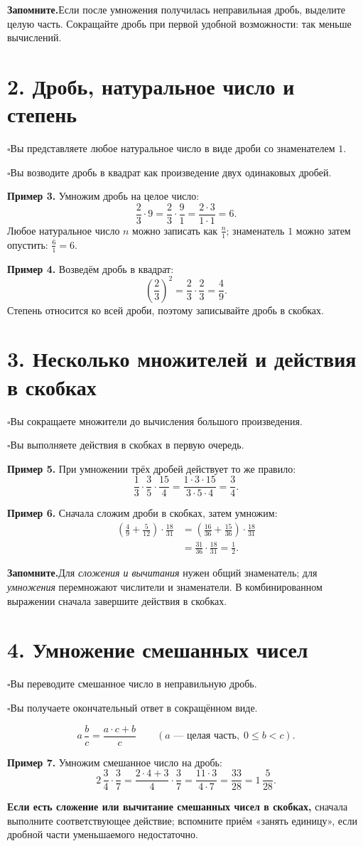 \documentclass[a4paper,12pt]{article}
\newcommand{\sectionline}[1]{\section*{\color{darkaccent}#1}}
\newcommand{\learn}[1]{\par\noindent$\square$\enspace #1\par}
\newcommand{\keyidea}[1]{\par\noindent\textcolor{darkaccent}{\textbf{Запомните.}}\enspace #1\par}
\newcommand{\mix}[3]{#1\,\frac{#2}{#3}}
\begin{document}
\keyidea{Если после умножения получилась неправильная дробь, выделите целую часть.
Сокращайте дробь при первой удобной возможности: так меньше вычислений.}

\sectionline{2. Дробь, натуральное число и степень}
\learn{Вы представляете любое натуральное число в виде дроби со знаменателем $1$.}
\learn{Вы возводите дробь в квадрат как произведение двух одинаковых дробей.}

\textbf{Пример 3.} Умножим дробь на целое число:
\[
\frac23\cdot9
=\frac23\cdot\frac91
=\frac{2\cdot3}{1\cdot1}=\boxed6.
\]
Любое натуральное число $n$ можно записать как $\frac n1$;
знаменатель $1$ можно затем опустить: $\frac61=6$.

\textbf{Пример 4.} Возведём дробь в квадрат:
\[
\left(\frac23\right)^2
=\frac23\cdot\frac23
=\boxed{\frac49}.
\]
Степень относится ко всей дроби, поэтому записывайте дробь в скобках.

\clearpage
\sectionline{3. Несколько множителей и действия в скобках}
\learn{Вы сокращаете множители до вычисления большого произведения.}
\learn{Вы выполняете действия в скобках в первую очередь.}

\textbf{Пример 5.} При умножении трёх дробей действует то же правило:
\[
\frac13\cdot\frac35\cdot\frac{15}{4}
=\frac{1\cdot3\cdot15}{3\cdot5\cdot4}
=\boxed{\frac34}.
\]

\textbf{Пример 6.} Сначала сложим дроби в скобках, затем умножим:
\begin{align*}
\left(\frac49+\frac5{12}\right)\cdot\frac{18}{31}
&=\left(\frac{16}{36}+\frac{15}{36}\right)\cdot\frac{18}{31}\\
&=\frac{31}{36}\cdot\frac{18}{31}
=\boxed{\frac12}.
\end{align*}
\keyidea{Для \emph{сложения и вычитания} нужен общий знаменатель;
для \emph{умножения} перемножают числители и знаменатели. В комбинированном выражении
сначала завершите действия в скобках.}

\sectionline{4. Умножение смешанных чисел}
\learn{Вы переводите смешанное число в неправильную дробь.}
\learn{Вы получаете окончательный ответ в сокращённом виде.}

\[
\boxed{\mix{a}{b}{c}=\frac{a\cdot c+b}{c}}
\qquad (a\text{ --- целая часть},\;0\le b<c).
\]

\textbf{Пример 7.} Умножим смешанное число на дробь:
\[
\mix{2}{3}{4}\cdot\frac37
=\frac{2\cdot4+3}{4}\cdot\frac37
=\frac{11\cdot3}{4\cdot7}
=\frac{33}{28}=\boxed{\mix{1}{5}{28}}.
\]

\textbf{Если есть сложение или вычитание смешанных чисел в скобках,}
сначала выполните соответствующее действие; вспомните приём «занять единицу»,
если дробной части уменьшаемого недостаточно.
\end{document}
